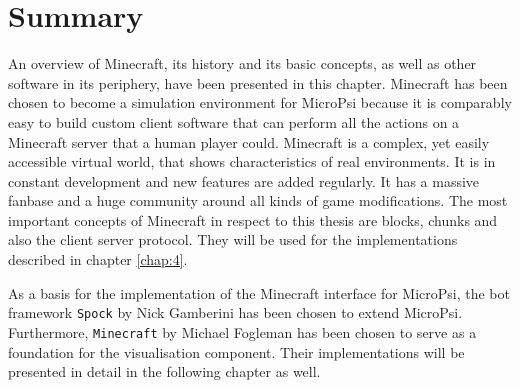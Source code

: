     \section{Summary}
An overview of Minecraft, its history and its basic concepts, as well as other software in its periphery, have been presented in this chapter. Minecraft has been chosen to become a simulation environment for MicroPsi because it is comparably easy to build custom client software that can perform all the actions on a Minecraft server that a human player could. Minecraft is a complex, yet easily accessible virtual world, that shows characteristics of real environments. It is in constant development and new features are added regularly. It has a massive fanbase and a huge community around all kinds of game modifications. The most important concepts of Minecraft in respect to this thesis are blocks, chunks and also the client server protocol. They will be used for the implementations described in chapter \ref{chap:4}.

As a basis for the implementation of the Minecraft interface for MicroPsi, the bot framework \texttt{Spock} by Nick Gamberini has been chosen to extend MicroPsi.
Furthermore, \texttt{Minecraft} by Michael Fogleman has been chosen to serve as a foundation for the visualisation component. Their implementations will be presented in detail in the following chapter as well.